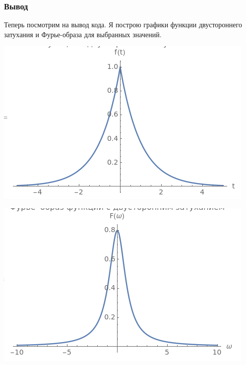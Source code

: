 \documentclass[a4paper,12pt]{article}
\begin{document}
\subsubsection{Вывод}
Теперь посмотрим на вывод кода. Я построю графики функции двустороннего затухания и Фурье-образа для выбранных значений.
\begin{center}
\begin{minipage}{0.48\textwidth}
  \centering
  \includegraphics[width=\linewidth]{images/5f11.png}
\end{minipage}
\hfill
\begin{minipage}{0.48\textwidth}
  \centering
  \includegraphics[width=\linewidth]{images/5F11.png}
\end{minipage}
\end{center}
\end{document}

